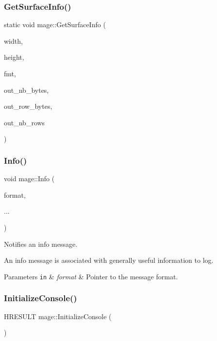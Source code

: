\subsubsection{\texorpdfstring{Get\+Surface\+Info()}{GetSurfaceInfo()}}
{\footnotesize\ttfamily static void mage\+::\+Get\+Surface\+Info (\begin{DoxyParamCaption}\item[{\+\_\+\+In\+\_\+ size\+\_\+t}]{width,  }\item[{\+\_\+\+In\+\_\+ size\+\_\+t}]{height,  }\item[{\+\_\+\+In\+\_\+ D\+X\+G\+I\+\_\+\+F\+O\+R\+M\+AT}]{fmt,  }\item[{\+\_\+\+Out\+\_\+opt\+\_\+ size\+\_\+t $\ast$}]{out\+\_\+nb\+\_\+bytes,  }\item[{\+\_\+\+Out\+\_\+opt\+\_\+ size\+\_\+t $\ast$}]{out\+\_\+row\+\_\+bytes,  }\item[{\+\_\+\+Out\+\_\+opt\+\_\+ size\+\_\+t $\ast$}]{out\+\_\+nb\+\_\+rows }\end{DoxyParamCaption})\hspace{0.3cm}{\ttfamily [static]}}

\hypertarget{namespacemage_add6aa5f13960ce07b20f48d273956a91}{}\label{namespacemage_add6aa5f13960ce07b20f48d273956a91} 
\subsubsection{\texorpdfstring{Info()}{Info()}}
{\footnotesize\ttfamily void mage\+::\+Info (\begin{DoxyParamCaption}\item[{const char $\ast$}]{format,  }\item[{}]{... }\end{DoxyParamCaption})}

Notifies an info message.

An info message is associated with generally useful information to log.


\begin{DoxyParams}[1]{Parameters}
\mbox{\tt in}  & {\em format} & Pointer to the message format. \\
\hline
\end{DoxyParams}
\hypertarget{namespacemage_a14798232aabfdf96d751f4fcca4e6ece}{}\label{namespacemage_a14798232aabfdf96d751f4fcca4e6ece} 
\subsubsection{\texorpdfstring{Initialize\+Console()}{InitializeConsole()}}
{\footnotesize\ttfamily H\+R\+E\+S\+U\+LT mage\+::\+Initialize\+Console (\begin{DoxyParamCaption}{ }\end{DoxyParamCaption})}

